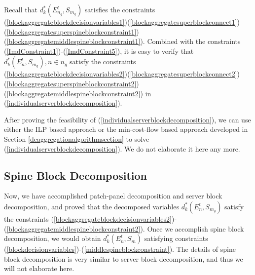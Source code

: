 \documentclass[letterpaper,twocolumn,10pt]{article}
\begin{document}
Recall that $d^*_k(E_{n_g}^t, S_{m_g})$ satisfies the constraints (\ref{blockaggregateblockdecisionvariables1})(\ref{blockaggregatesuperblockconnect1}) (\ref{blockaggregatesuperspineblockconstraint1})(\ref{blockaggregatemiddlespineblockconstraint1}). Combined with the constraints (\ref{ImdConstraint1})-(\ref{ImdConstraint5}), it is easy to verify that $d^*_{k}(E_n^t, S_{m_g}), n\in n_g$ satisfy the constraints
(\ref{blockaggregateblockdecisionvariables2})(\ref{blockaggregatesuperblockconnect2})(\ref{blockaggregatesuperspineblockconstraint2})(\ref{blockaggregatemiddlespineblockconstraint2}) in (\ref{individualserverblockdecomposition}).

After proving the feasibility of (\ref{individualserverblockdecomposition}), we can use either the ILP based approach or the min-cost-flow based approach developed in Section \ref{deaggregationalgorithmsection} to solve (\ref{individualserverblockdecomposition}). We do not elaborate it here any more.

\subsection{Spine Block Decomposition}
Now, we have accomplished patch-panel decomposition and server block decomposition, and proved that the decomposed variables $d^*_{k}(E_{n}^t, S_{m_g})$ satisfy the constraints (\ref{blockaggregateblockdecisionvariables2})-(\ref{blockaggregatemiddlespineblockconstraint2}). Once we accomplish spine block decomposition, we would obtain $d^*_{k}(E_{n}^t, S_{m})$ satisfying constraints (\ref{blockdecisionvariables})-(\ref{middlespineblockconstraint}). The details of spine block decomposition is very similar to server block decomposition, and thus we will not elaborate here.
\end{document}
